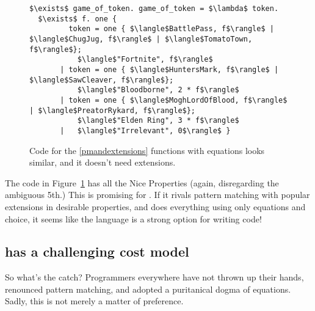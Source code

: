 \documentclass[manuscript,screen,review, 12pt, nonacm]{acmart}
\begin{document}
\begin{figure}[ht]
\begin{minipage}[h]{0.5\linewidth}
        \vspace{4ex}
        \end{minipage} 
        \begin{minipage}[h]{\linewidth}
          \verselst
          \begin{lstlisting}[numbers=none, basicstyle=\tiny, xleftmargin=9em, 
                            frame=single, showstringspaces=false]
$\exists$ game_of_token. game_of_token = $\lambda$ token. 
  $\exists$ f. one {
         token = one { $\langle$BattlePass, f$\rangle$ | $\langle$ChugJug, f$\rangle$ | $\langle$TomatoTown, f$\rangle$}; 
           $\langle$"Fortnite", f$\rangle$
       | token = one { $\langle$HuntersMark, f$\rangle$ | $\langle$SawCleaver, f$\rangle$}; 
           $\langle$"Bloodborne", 2 * f$\rangle$
       | token = one { $\langle$MoghLordOfBlood, f$\rangle$ | $\langle$PreatorRykard, f$\rangle$}; 
           $\langle$"Elden Ring", 3 * f$\rangle$
       |   $\langle$"Irrelevant", 0$\rangle$ }
          \end{lstlisting}
            \label{fig:versegot} 
        \vspace{4ex}
        \end{minipage}%
    \caption{Code for the \ref{pmandextensions} functions with equations looks
    similar, and it doesn't need extensions.}
    \label{fig:verseextfuncs}
      \end{figure}
        
    The code in Figure~\ref{fig:verseextfuncs} has all the Nice Properties
    (again, disregarding the ambiguous 5th.) This is promising for \VC. If it
    rivals pattern matching with popular extensions in desirable properties, and
    \VC does everything using only equations and choice, it seems like the
    language is a strong option for writing code! 

    \subsection{\VC has a challenging cost model}
    \label{vcbadcost}

    So what's the catch? Programmers everywhere have not thrown up their hands,
    renounced pattern matching, and adopted a puritanical dogma of equations. 
    Sadly, this is not merely a matter of preference. 
\end{document}
